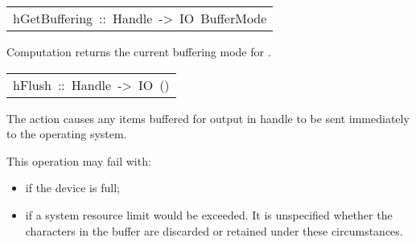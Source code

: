 \begin{haddockdesc}
\item[\begin{tabular}{@{}l}
hGetBuffering\ ::\ Handle\ ->\ IO\ BufferMode
\end{tabular}]\haddockbegindoc
Computation   returns the current buffering mode
 for .
\par

\end{haddockdesc}
\begin{haddockdesc}
\item[\begin{tabular}{@{}l}
hFlush\ ::\ Handle\ ->\ IO\ ()
\end{tabular}]\haddockbegindoc
The action   causes any items buffered for output
 in handle  to be sent immediately to the operating system.
\par
This operation may fail with:
\par
\begin{itemize}
\item
  if the device is full;
\par

\item
  if a system resource limit would be exceeded.
    It is unspecified whether the characters in the buffer are discarded
    or retained under these circumstances.
\par

\end{itemize}

\end{haddockdesc}
